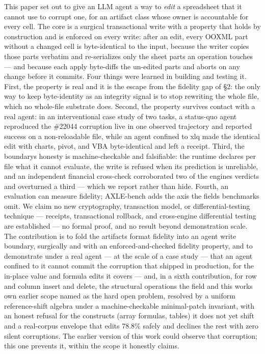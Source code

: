 \documentclass[
]{article}
\begin{document}
This paper set out to give an LLM agent a way to \emph{edit} a
spreadsheet that it cannot use to corrupt one, for an artifact class
whose owner is accountable for every cell. The core is a surgical
transactional write with a property that holds by construction and is
enforced on every write: after an edit, every OOXML part without a
changed cell is byte-identical to the input, because the writer copies
those parts verbatim and re-serializes only the sheet parts an operation
touches --- and because each apply byte-diffs the un-edited parts and
aborts on any change before it commits. Four things were learned in
building and testing it. First, the property is real and it is the
escape from the fidelity gap of §2: the only way to keep byte-identity
as an integrity signal is to stop rewriting the whole file, which no
whole-file substrate does. Second, the property survives contact with a
real agent: in an interventional case study of two tasks, a status-quo
agent reproduced the \#22044 corruption live in one observed trajectory
and reported success on a non-reloadable file, while an agent confined
to xlq made the identical edit with charts, pivot, and VBA
byte-identical and left a receipt. Third, the boundary\textquotesingle s
honesty is machine-checkable and falsifiable: the runtime declares per
file what it cannot evaluate, the write is refused when its prediction
is unreliable, and an independent financial cross-check corroborated two
of the engine\textquotesingle s verdicts and overturned a third ---
which we report rather than hide. Fourth, an evaluation can measure
fidelity; AXLE-bench adds the axis the field\textquotesingle s
benchmarks omit. We claim no new cryptography, transaction model, or
differential-testing technique --- receipts, transactional rollback, and
cross-engine differential testing are established --- no formal proof,
and no result beyond demonstration scale. The contribution is to fold
the artifact\textquotesingle s format fidelity into an agent write
boundary, surgically and with an enforced-and-checked fidelity property,
and to demonstrate under a real agent --- at the scale of a case study
--- that an agent confined to it cannot commit the corruption that
shipped in production, for the in-place value and formula edits it
covers --- and, in a sixth contribution, for row and column insert and
delete, the structural operations the field and this
work\textquotesingle s own earlier scope named as the hard open problem,
resolved by a uniform reference-shift algebra under a machine-checkable
minimal-patch invariant, with an honest refusal for the constructs
(array formulas, tables) it does not yet shift and a real-corpus
envelope that edits 78.8\% safely and declines the rest with zero silent
corruptions. The earlier version of this work could observe that
corruption; this one prevents it, within the scope it honestly claims.
\end{document}
